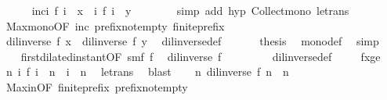 \begin{isabellebody}
\ \ \ \ \isamarkupfalse%
\ inc{\isacharcolon}{\isacartoucheopen}{\isacharbraceleft}i{\isachardot}\ f\ i\ {\isasymle}\ x{\isacharbraceright}\ {\isasymsubseteq}\ {\isacharbraceleft}i{\isachardot}\ f\ i\ {\isasymle}\ y{\isacharbraceright}{\isacartoucheclose}\isanewline
\ \ \ \ \ \ \isamarkupfalse%
\ {\isacharparenleft}simp\ add{\isacharcolon}\ hyp\ Collect{\isacharunderscore}mono\ le{\isacharunderscore}trans{\isacharparenright}\isanewline
\ \ \ \ \isamarkupfalse%
\ Max{\isacharunderscore}mono{\isacharbrackleft}OF\ inc\ prefix{\isacharunderscore}not{\isacharunderscore}empty\ finite{\isacharunderscore}prefix{\isacharbrackright}\isanewline
\ \ \ \ \ \ \isamarkupfalse%
\ {\isachardoublequoteopen}{\isacharparenleft}dil{\isacharunderscore}inverse\ f{\isacharparenright}\ x\ {\isasymle}\ {\isacharparenleft}dil{\isacharunderscore}inverse\ f{\isacharparenright}\ y{\isachardoublequoteclose}\ \isamarkupfalse%
\ dil{\isacharunderscore}inverse{\isacharunderscore}def\ \isacommand{{\isachardot}}\isamarkupfalse%
\isanewline
\ \ \isacommand{{\isacharbraceright}}\isamarkupfalse%
\ \isamarkupfalse%
\ {\isacharquery}thesis\ \isamarkupfalse%
\ mono{\isacharunderscore}def\ \isamarkupfalse%
\ simp\isanewline
\ \ \isamarkupfalse%
\isanewline
\isanewline
\ \ \isamarkupfalse%
\ first{\isacharunderscore}dilated{\isacharunderscore}instant{\isacharbrackleft}OF\ smf\ f{}{\isacharbrackright}\ \isamarkupfalse%
\ {}{\isacharcolon}{\isacartoucheopen}{\isacharparenleft}dil{\isacharunderscore}inverse\ f{\isacharparenright}\ {}\ {\isacharequal}\ {}{\isacartoucheclose}\isanewline
\ \ \ \ \isamarkupfalse%
\ dil{\isacharunderscore}inverse{\isacharunderscore}def\ \isacommand{{\isachardot}}\isamarkupfalse%
\isanewline
\isanewline
\ \ \isamarkupfalse%
\ fxge\ \isamarkupfalse%
\ {\isacartoucheopen}{\isasymforall}n\ i{\isachardot}\ f\ i\ {\isasymle}\ n\ {\isasymlongrightarrow}\ i\ {\isasymle}\ n{\isacartoucheclose}\ \isamarkupfalse%
\ le{\isacharunderscore}trans\ \isamarkupfalse%
\ blast\isanewline
\ \ \isamarkupfalse%
\ {}{\isacharcolon}{\isacartoucheopen}{\isasymforall}n{\isachardot}\ {\isacharparenleft}dil{\isacharunderscore}inverse\ f{\isacharparenright}\ n\ {\isasymle}\ n{\isacartoucheclose}\ \isamarkupfalse%
\ Max{\isacharunderscore}in{\isacharbrackleft}OF\ finite{\isacharunderscore}prefix\ prefix{\isacharunderscore}not{\isacharunderscore}empty{\isacharbrackright}\ \isanewline

\end{isabellebody}
